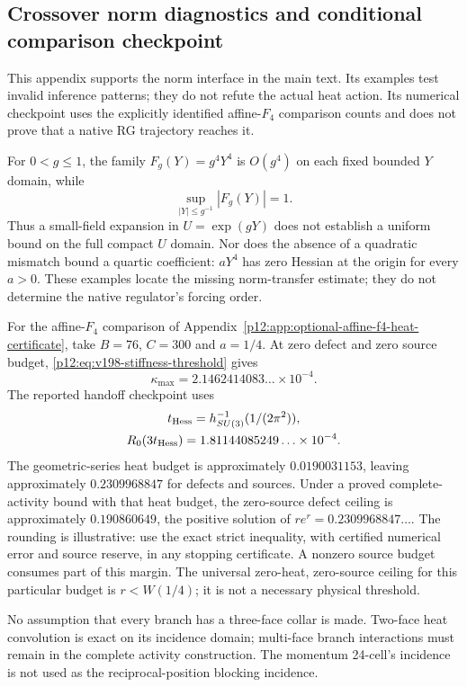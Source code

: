 \documentclass[12pt,a4paper]{article}
\begin{document}
\subsection{Crossover norm diagnostics and conditional comparison checkpoint}
\label{p12:app:v198-norm-domain-diagnostics}

This appendix supports the norm interface in the main text.  Its examples
test invalid inference patterns; they do not refute the actual heat action.
Its numerical checkpoint uses the explicitly identified affine-$F_4$
comparison counts and does not prove that a native RG trajectory reaches it.

For $0<g\le1$, the family $F_g(Y)=g^4Y^4$ is $O(g^4)$ on each fixed
bounded $Y$ domain, while
\[
 \sup_{|Y|\le g^{-1}}|F_g(Y)|=1.
\]
Thus a small-field expansion in $U=\exp(gY)$ does not establish a uniform
bound on the full compact $U$ domain.  Nor does the absence of a quadratic
mismatch bound a quartic coefficient: $aY^4$ has zero Hessian at the origin
for every $a>0$.  These examples locate the missing norm-transfer estimate;
they do not determine the native regulator's forcing order.

For the affine-$F_4$ comparison of
Appendix~\ref{p12:app:optional-affine-f4-heat-certificate}, take
$B=76$, $C=300$ and $a=1/4$.  At zero defect and zero source budget,
\eqref{p12:eq:v198-stiffness-threshold} gives
\[
 \kappa_{\max}=2.1462414083\ldots\times10^{-4}.
\]
The reported handoff checkpoint uses
\[
\begin{gathered}
t_{\rm Hess}=h_{SU(3)}^{-1}(1/(2\pi^2)),\\
R_0(3t_{\rm Hess})=1.81144085249\ldots\times10^{-4}.
\end{gathered}
\]
The geometric-series heat budget is approximately $0.0190031153$, leaving
approximately $0.2309968847$ for defects and sources.  Under a proved
complete-activity bound with that heat budget, the zero-source defect
ceiling is approximately $0.190860649$, the positive solution of
$r e^r=0.2309968847\ldots$.  The rounding is illustrative: use the exact
strict inequality, with certified numerical error and source reserve, in
any stopping certificate.  A nonzero source budget consumes part of this
margin.  The universal zero-heat, zero-source ceiling for this particular
budget is $r<W(1/4)$; it is not a necessary physical threshold.

No assumption that every branch has a three-face collar is made.  Two-face
heat convolution is exact on its incidence domain; multi-face branch
interactions must remain in the complete activity construction.  The
momentum 24-cell's incidence is not used as the reciprocal-position
blocking incidence.
\end{document}

